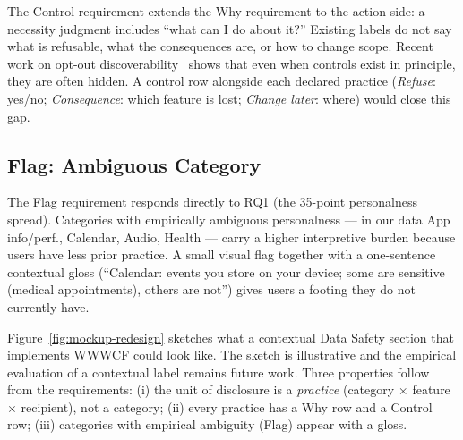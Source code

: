 \documentclass[11pt,a4paper]{article}
\begin{document}
The Control requirement extends the Why requirement to the action
side: a necessity judgment includes ``what can I do about it?''
Existing labels do not say what is refusable, what the consequences
are, or how to change scope. Recent work on opt-out
discoverability~\citep{habib:etal:2020} shows that even when controls
exist in principle, they are often hidden. A control row alongside
each declared practice (\emph{Refuse}: yes/no; \emph{Consequence}:
which feature is lost; \emph{Change later}: where) would close this
gap.

\subsection{Flag: Ambiguous Category}
\label{subsec:design-flag}

The Flag requirement responds directly to RQ1 (the 35-point
personalness spread). Categories with empirically ambiguous
personalness --- in our data App info/perf., Calendar, Audio, Health
--- carry a higher interpretive burden because users have less prior
practice. A small visual flag together with a one-sentence contextual
gloss (``Calendar: events you store on your device; some are sensitive
(medical appointments), others are not'') gives users a footing they
do not currently have.




Figure~\ref{fig:mockup-redesign} sketches what a contextual Data Safety
section that implements WWWCF could look like. The sketch is
illustrative and the empirical evaluation of a contextual label
remains future work. Three properties follow from the requirements:
(i) the unit of disclosure is a \emph{practice} (category $\times$
feature $\times$ recipient), not a category; (ii) every practice has
a Why row and a Control row; (iii) categories with empirical
ambiguity (Flag) appear with a gloss.
\end{document}
